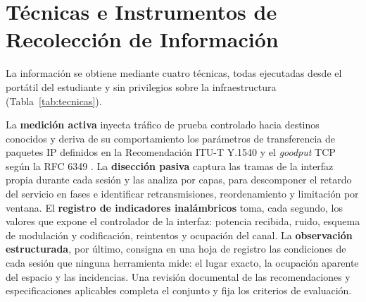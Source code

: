 \section{Técnicas e Instrumentos de Recolección de Información}

La información se obtiene mediante cuatro técnicas, todas ejecutadas desde el portátil del estudiante y sin privilegios sobre la infraestructura (Tabla~\ref{tab:tecnicas}).

La \textbf{medición activa} inyecta tráfico de prueba controlado hacia destinos conocidos y deriva de su comportamiento los parámetros de transferencia de paquetes IP definidos en la Recomendación ITU-T Y.1540 \cite{ituy1540} y el \textit{goodput} TCP según la RFC 6349 \cite{rfc6349}. La \textbf{disección pasiva} captura las tramas de la interfaz propia durante cada sesión y las analiza por capas, para descomponer el retardo del servicio en fases e identificar retransmisiones, reordenamiento y limitación por ventana. El \textbf{registro de indicadores inalámbricos} toma, cada segundo, los valores que expone el controlador de la interfaz: potencia recibida, ruido, esquema de modulación y codificación, reintentos y ocupación del canal. La \textbf{observación estructurada}, por último, consigna en una hoja de registro las condiciones de cada sesión que ninguna herramienta mide: el lugar exacto, la ocupación aparente del espacio y las incidencias. Una revisión documental de las recomendaciones y especificaciones aplicables completa el conjunto y fija los criterios de evaluación.

